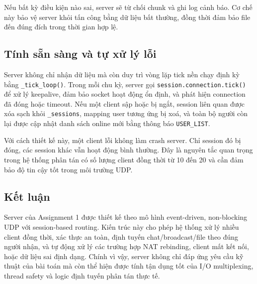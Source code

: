 Nếu bất kỳ điều kiện nào sai, server sẽ từ chối chunk và ghi log cảnh báo. Cơ chế này bảo vệ server khỏi tấn công bằng dữ liệu bất thường, đồng thời đảm bảo file đến đúng đích trong thời gian hợp lệ.

\subsection{Tính sẵn sàng và tự xử lý lỗi}
Server không chỉ nhận dữ liệu mà còn duy trì vòng lặp tick nền chạy định kỳ bằng \texttt{\_tick\_loop()}. Trong mỗi chu kỳ, server gọi \texttt{session.connection.tick()} để xử lý keepalive, đảm bảo socket hoạt động ổn định, và phát hiện connection đã đóng hoặc timeout. Nếu một client sập hoặc bị ngắt, session liên quan được xóa sạch khỏi \texttt{\_sessions}, mapping user tương ứng bị xoá, và toàn bộ người còn lại được cập nhật danh sách online mới bằng thông báo \texttt{USER\_LIST}.

Với cách thiết kế này, một client lỗi không làm crash server. Chỉ session đó bị đóng, các session khác vẫn hoạt động bình thường. Đây là nguyên tắc quan trọng trong hệ thống phân tán có số lượng client đồng thời từ 10 đến 20 và cần đảm bảo độ tin cậy tốt trong môi trường UDP.

\subsection{Kết luận}
Server của Assignment 1 được thiết kế theo mô hình event-driven, non-blocking UDP với session-based routing. Kiến trúc này cho phép hệ thống xử lý nhiều client đồng thời, xác thực an toàn, định tuyến chat/broadcast/file theo đúng người nhận, và tự động xử lý các trường hợp NAT rebinding, client mất kết nối, hoặc dữ liệu sai định dạng. Chính vì vậy, server không chỉ đáp ứng yêu cầu kỹ thuật của bài toán mà còn thể hiện được tính tận dụng tốt của I/O multiplexing, thread safety và logic định tuyến phân tán thực tế.
